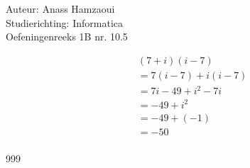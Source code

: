 \documentclass[a4paper]{article}
\begin{document}
  
\noindent \large Auteur: Anass Hamzaoui \\
\noindent \large Studierichting: Informatica\\
\noindent \large Oefeningenreeks 1B nr. 10.5\\ 

\medskip

\normalsize

\begin{eqnarray*}
    && (7 + i)(i - 7) \\
    && = 7(i - 7) + i(i - 7) \\
    && = 7i - 49 + i^2 - 7i \\
    && = -49 + i^2 \\
    && = -49 + (-1) \\
    && = -50 \\
\end{eqnarray*}

\begin{thebibliography}{999}
\end{thebibliography}
\end{document}
